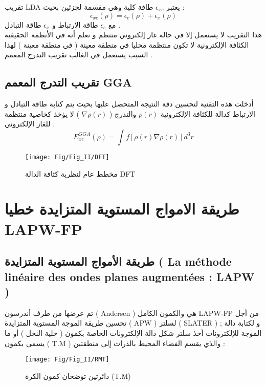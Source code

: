 تقريب LDA   يعتبر $ \epsilon_{xc} $ طاقة كلية وهي مقسمة لجزئين بحيث : 
\begin{equation}\label{key}
	\epsilon_{xc} (\rho) = \epsilon_{c} (\rho) + \epsilon_{x} (\rho)
\end{equation}
مع $  \epsilon_{c} $ طاقة الارتباط و $ \epsilon_{x} $ طاقة التبادل .\\
هذا التقريب لا يستعمل إلا في حالة غاز إلكتروني منتظم و نعلم أنه في الأنظمة الحقيقية الكثافة الإلكترونية لا تكون منتظمة محليا في منطقة معينة ( في منطقة معينة ) لهذا السبب يستعمل في الغالب تقريب التدرج المعمم .

\subsection{ تقريب التدرج المعمم GGA }

أدخلت هذه التقنية لتحسين دقة النتيجة المتحصل عليها بحيث يتم كتابة طاقة التبادل و الارتباط كدالة للكثافة الإلكترونية $ \rho(r) $ والتدرج ( $ \nabla \rho(r) $ )  لا يؤخذ كخاصية منتظمة للغاز الإلكتروني .
\begin{equation}\label{}
	E_{xc}^{GGA} (\rho) =  \int f \left[\rho (r) \nabla \rho(r) \right] d^{3}r
\end{equation}

\begin{figure}[bh]
	\centering
	\texttt{[image: Fig/Fig\_II/DFT]}
	\caption{ مخطط عام لنظرية كثافة الدالة DFT }
	\label{fig:dft-11}
\end{figure}


\section{ طريقة الامواج المستوية المتزايدة خطيا LAPW-FP }

\subsection{ طريقة الأمواج المستوية المتزايدة  ( La méthode linéaire des ondes planes augmentées : LAPW )}
تم عرضها من طرف أندرسون ( Andersen ) هي والكمون الكامل  LAPW-FP من أجل تحسين طريقة الموجة المستوية المتزايدة (  APW ) لسلتر ( SLATER ) ; و لكتابة دالة الموجة للإلكترونات أخذ سلتر شكل دالة الإلكترونات الخاصة بكمون ( خلية النحل ) أو ما يسمى بكمون ( T.M ) والذي يقسم الفضاء المحيط بالذرات إلى منطقتين :

\begin{figure}[h]
	\centering
	\texttt{[image: Fig/Fig\_II/RMT]}
	\caption{دائرتين توضحان كمون الكرة (T.M) }
	\label{fig:lapw1}
\end{figure}

